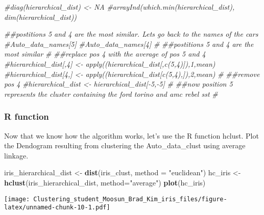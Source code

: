 \documentclass[11pt,]{article}
\newenvironment{Shaded}{\begin{snugshade}}{\end{snugshade}}
\newcommand{\CommentTok}[1]{\textcolor[rgb]{0.56,0.35,0.01}{\textit{#1}}}
\newcommand{\DataTypeTok}[1]{\textcolor[rgb]{0.13,0.29,0.53}{#1}}
\newcommand{\DecValTok}[1]{\textcolor[rgb]{0.00,0.00,0.81}{#1}}
\newcommand{\KeywordTok}[1]{\textcolor[rgb]{0.13,0.29,0.53}{\textbf{#1}}}
\newcommand{\NormalTok}[1]{#1}
\newcommand{\OtherTok}[1]{\textcolor[rgb]{0.56,0.35,0.01}{#1}}
\newcommand{\StringTok}[1]{\textcolor[rgb]{0.31,0.60,0.02}{#1}}
\begin{document}
\begin{Shaded}
\begin{Highlighting}[]
\CommentTok{#diag(hierarchical_dist) <- NA}
\CommentTok{#arrayInd(which.min(hierarchical_dist), dim(hierarchical_dist))}

\CommentTok{##postitions 5 and 4 are the most similar. Lets go back to the names of the cars}
\CommentTok{#Auto_data_names[5]}
\CommentTok{#Auto_data_names[4]}
\CommentTok{#}
\CommentTok{##postitions 5 and 4 are the most similar}
\CommentTok{#}
\CommentTok{##replace pos 4 with the average of pos 5 and 4}
\CommentTok{#hierarchical_dist[,4] <- apply((hierarchical_dist[,c(5,4)]),1,mean)}
\CommentTok{#hierarchical_dist[4,] <- apply((hierarchical_dist[c(5,4),]),2,mean)}
\CommentTok{#}
\CommentTok{##remove pos 4}
\CommentTok{#hierarchical_dist <- hierarchical_dist[-5,-5]}
\CommentTok{#}
\CommentTok{##now position 5 represents the cluster containing the ford torino and amc rebel sst}
\CommentTok{#}
\end{Highlighting}
\end{Shaded}

\hypertarget{r-function}{%
\subsubsection{R function}\label{r-function}}

Now that we know how the algorithm works, let's use the R function
hclust. Plot the Dendogram resulting from clustering the
Auto\_data\_clust using average linkage.

\begin{Shaded}
\begin{Highlighting}[]
\NormalTok{iris_hierarchical_dist <-}\StringTok{ }\KeywordTok{dist}\NormalTok{(iris_clust, }\DataTypeTok{method =} \StringTok{"euclidean"}\NormalTok{)}
\NormalTok{hc_iris <-}\StringTok{ }\KeywordTok{hclust}\NormalTok{(iris_hierarchical_dist, }\DataTypeTok{method=}\StringTok{"average"}\NormalTok{)}
\KeywordTok{plot}\NormalTok{(hc_iris)}
\end{Highlighting}
\end{Shaded}

\texttt{[image: Clustering\_student\_Moosun\_Brad\_Kim\_iris\_files/figure-latex/unnamed-chunk-10-1.pdf]}

\begin{Shaded}
\end{Shaded}
\end{document}
